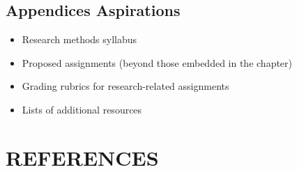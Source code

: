 \documentclass[
  11pt,
]{book}
\providecommand{\tightlist}{%
  \setlength{\itemsep}{0pt}\setlength{\parskip}{0pt}}
\begin{document}
\section{Appendices Aspirations}\label{appendices-aspirations}

\begin{itemize}
\tightlist
\item
  Research methods syllabus
\item
  Proposed assignments (beyond those embedded in the chapter)
\item
  Grading rubrics for research-related assignments
\item
  Lists of additional resources
\end{itemize}

\chapter*{REFERENCES}\label{references-2}



\end{document}
